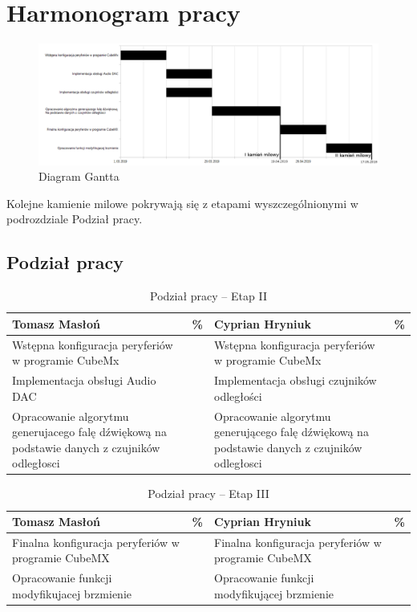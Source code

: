 \documentclass[10pt, a4paper]{article}
\begin{document}
\section{Harmonogram pracy}

\begin{figure}[H]
	\centering
	\includegraphics[width=\textwidth]{gantt_diagram.png}
	\caption{Diagram Gantta}
	\label{fig:DiagramGantta}
\end{figure}

Kolejne kamienie milowe pokrywają się z etapami wyszczególnionymi w podrozdziale Podział pracy.
\subsection{Podział pracy}

\begin{table}[H]
	\centering
	\begin{tabular}{|L{7cm}|L{0.8cm}||L{7cm}|L{0.8cm}|}
		\hline
		\hline
		\textbf{Tomasz Masłoń} & 
		\% & 
		\textbf{Cyprian Hryniuk} & \%\\
		\hline
		\hline
		Wstępna konfiguracja peryferiów w programie CubeMx		& &	
		 	Wstępna konfiguracja peryferiów w programie CubeMx	&\\
		\hline
		Implementacja obsługi Audio DAC & &
		 	Implementacja obsługi czujników odległości&\\
		\hline
		Opracowanie algorytmu generujacego falę dźwiękową na podstawie danych z czujników odległosci & &
		Opracowanie algorytmu generującego falę dźwiękową na podstawie danych z czujników odległosci & \\
		\hline
		\end{tabular}
	\caption{Podział pracy -- Etap II}
	\label{tab:PodzialPracyEtap2}
\end{table}

\begin{table}[H]
	\centering
	\begin{tabular}{|L{7cm}|L{0.8cm}||L{7cm}|L{0.8cm}|}
		\hline
		\hline
		\textbf{Tomasz Masłoń} & 
		\% & 
		\textbf{Cyprian Hryniuk} & \%\\
		\hline
		\hline
		Finalna konfiguracja peryferiów w programie CubeMX		& &	
		Finalna konfiguracja peryferiów w programie CubeMX &\\
		\hline
		Opracowanie funkcji modyfikujacej brzmienie  & &
		Opracowanie funkcji modyfikującej brzmienie &\\
		\hline	
	\end{tabular}
	\caption{Podział pracy -- Etap III}
	\label{tab:PodzialPracyEtap3}
\end{table}
\end{document}
